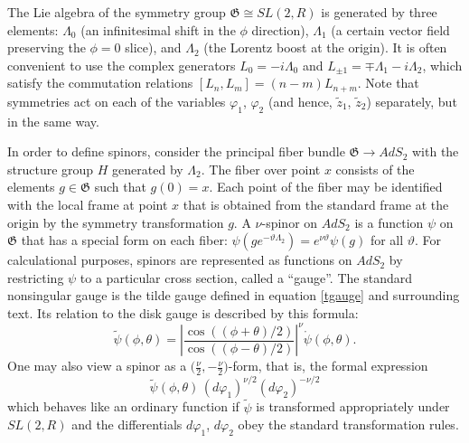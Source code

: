 \documentclass[11pt]{article}
\newcommand{\vp}{\varphi}
\newcommand{\vt}{\vartheta}
\newcommand{\RR}{\mathbb{R}}
\DeclareMathOperator{\SL}{SL}
\DeclareMathOperator{\AdS}{AdS}
\newcommand{\GG}{\mathfrak{G}}
\newcommand{\tGG}{\widetilde{\GG}}
\newcommand{\tz}{\tilde{z}}
\newcommand{\tpsi}{\tilde{\psi}}
\newcommand{\rpsi}{\mathring{\psi}}
\def\widetilde#1{#1}%
\def\AdS{AdS}
\def\SL{SL}
\def\RR{R}
\begin{document}
The Lie algebra of the symmetry group $\tGG\cong\widetilde{\SL}(2,\RR)$ is generated by three elements: $\Lambda_0$ (an infinitesimal shift in the $\phi$ direction), $\Lambda_1$ (a certain vector field preserving the $\phi=0$ slice), and $\Lambda_2$ (the Lorentz boost at the origin). It is often convenient to use the complex generators $L_{0}=-i\Lambda_0$ and $L_{\pm1}=\mp\Lambda_1-i\Lambda_2$, which satisfy the commutation relations $[L_n,L_m]=(n-m)L_{n+m}$. Note that symmetries act on each of the variables $\vp_1$, $\vp_2$ (and hence, $\tz_1$, $\tz_2$) separately, but in the same way.

In order to define spinors, consider the principal fiber bundle $\tGG\to\widetilde{\AdS}_2$ with the structure group $H$ generated by $\Lambda_2$. The fiber over point $x$ consists of the elements $g\in\tGG$ such that $g(0)=x$. Each point of the fiber may be identified with the local frame at point $x$ that is obtained from the standard frame at the origin by the symmetry transformation $g$. A $\nu$-spinor on $\widetilde{\AdS}_2$ is a function $\psi$ on $\tGG$ that has a special form on each fiber: $\psi(ge^{-\vt\Lambda_2})=e^{\nu\vt}\psi(g)$ for all $\vt$. For calculational purposes, spinors are represented as functions on $\widetilde{\AdS}_2$ by restricting $\psi$ to a particular cross section, called a ``gauge''. The standard nonsingular gauge is the tilde gauge defined in equation \eqref{tgauge} and surrounding text. Its relation to the disk gauge is described by this formula:
\begin{equation}\label{tilde_to_disk}
\tpsi(\phi,\theta)
=\left|\frac{\cos((\phi+\theta)/2)}{\cos((\phi-\theta)/2)}\right|^{\nu}
\rpsi(\phi,\theta).
\end{equation}
One may also view a spinor as a $\bigl(\frac{\nu}{2}, -\frac{\nu}{2}\bigr)$-form, that is, the formal expression
\begin{equation}\label{nunu-form}
\tpsi(\phi,\theta)\,(d\vp_1)^{\nu/2}(d\vp_2)^{-\nu/2}
\end{equation}
which behaves like an ordinary function if $\tpsi$ is transformed appropriately under $\widetilde{\SL}(2,\RR)$ and the differentials $d\vp_1$, $d\vp_2$ obey the standard transformation rules.
\end{document}
